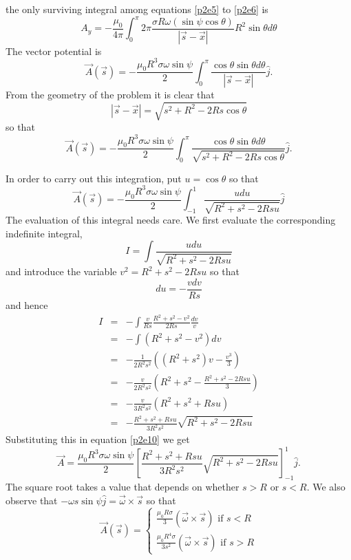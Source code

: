 \documentclass{article}
\begin{document}
\begin{enumerate}
the only surviving integral among equations \eqref{p2e5} to \eqref{p2e6} is
\[
A_y = -\frac{\mu_0}{4\pi}\int_0^\pi 2\pi 
\frac{\sigma R\omega(\sin\psi\cos\theta)}{|\vec{s} - \vec{x}|} R^2\sin\theta d\theta 
\]
The vector potential is
\begin{equation}\label{p2e8}
\vec{A}(\vec{s}) = -\frac{\mu_0 R^3\sigma\omega\sin\psi}{2}
\int_0^\pi \frac{\cos\theta\sin\theta d\theta}{|\vec{s} - \vec{x}|}\hat{j}.
\end{equation}
From the geometry of the problem it is clear that
\[
|\vec{s} - \vec{x}| = \sqrt{s^2 + R^2 - 2Rs\cos\theta}
\]
so that
\begin{equation}\label{p2e9}
\vec{A}(\vec{s}) = -\frac{\mu_0 R^3\sigma\omega\sin\psi}{2}
\int_0^\pi \frac{\cos\theta\sin\theta d\theta}
{\sqrt{s^2 + R^2 - 2Rs\cos\theta}}\hat{j}.
\end{equation}

In order to carry out this integration, put $u = \cos\theta$ so that
\begin{equation}\label{p2e10}
\vec{A}(\vec{s}) = -\frac{\mu_0 R^3\sigma\omega\sin\psi}{2}
\int_{-1}^1\frac{udu}{\sqrt{R^2 + s^2 - 2Rsu}}\hat{j}
\end{equation}
The evaluation of this integral needs care. We first evaluate the corresponding
indefinite integral,
\[
I = \int \frac{udu}{\sqrt{R^2 + s^2 - 2Rsu}}
\]
and introduce the variable $v^2 = R^2 + s^2 - 2Rsu$ so that
\[
du = -\frac{vdv}{Rs}
\]
and hence
\begin{eqnarray*}
I &=& -\int \frac{v}{Rs}\frac{R^2 + s^2 - v^2}{2Rs}\frac{dv}{v} \\
 &=& -\int (R^2 + s^2 - v^2)dv \\
 &=& -\frac{1}{2R^2s^2}\left((R^2+s^2)v - \frac{v^3}{3}\right) \\
 &=& -\frac{v}{2R^2s^2}\left(R^2+s^2 - \frac{R^2+s^2-2Rsu}{3}\right) \\
 &=& -\frac{v}{3R^2s^2}(R^2 + s^2 + Rsu) \\
 &=& -\frac{R^2+s^2+Rsu}{3R^2s^2}\sqrt{R^2 + s^2 - 2Rsu}
\end{eqnarray*}
Substituting this in equation \eqref{p2e10} we get
\begin{equation}\label{p2e11}
\vec{A} = \frac{\mu_0R^3\sigma\omega\sin\psi}{2}
\left[\frac{R^2+s^2+Rsu}{3R^2s^2}\sqrt{R^2 + s^2 - 2Rsu}\right]_{-1}^1\hat{j}.
\end{equation}
The square root takes a value that depends on whether $s > R$ or $s < R$. We
also observe that $-\omega s \sin\psi\hat{j} = \vec{\omega}\times\vec{s}$ so 
that
\begin{equation}\label{p2e12}
\vec{A}(\vec{s}) = \begin{cases}
\frac{\mu_0 R\sigma}{3}(\vec{\omega} \times \vec{s}) \text{ if } s < R \\
\frac{\mu_0 R^4\sigma}{3s^2}(\vec{\omega} \times \vec{s}) \text{ if } s > R
\end{cases}
\end{equation}


\end{enumerate}
\end{document}
